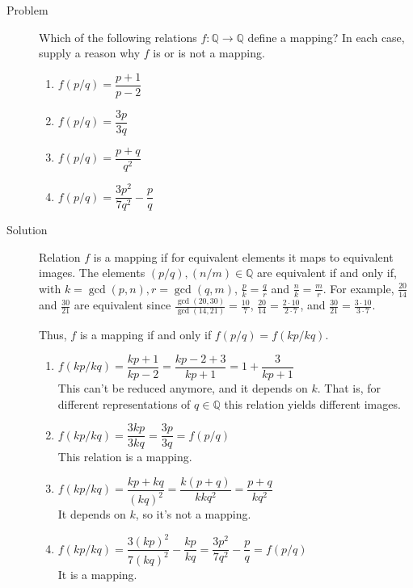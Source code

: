 \begin{description}
\item[Problem] Which of the following relations $f : \mathbb{Q} \rightarrow
\mathbb{Q}$ define a mapping? In each case, supply a reason why $f$ is or is
not a mapping.

\begin{multicols}{2}
\begin{enumerate}
\item $f(p / q) = \dfrac{p + 1}{p - 2}$
\item $f(p / q) = \dfrac{3p}{3q}$
\item $f(p / q) = \dfrac{p + q}{q^2}$
\item $f(p / q) = \dfrac{3p^2}{7q^2} - \dfrac{p}{q}$
\end{enumerate}
\end{multicols}

\item[Solution]

Relation $f$ is a mapping if for equivalent elements it maps to equivalent
images. The elements $(p / q), (n / m) \in \mathbb{Q}$ are equivalent if and
only if, with $k = \gcd(p, n), r = \gcd(q, m)$, $\frac{p}{k} = \frac{q}{r}$ and
$\frac{n}{k} = \frac{m}{r}$. For example, $\frac{20}{14}$ and $\frac{30}{21}$
are equivalent since $\frac{\gcd(20, 30)}{\gcd(14, 21)} = \frac{10}{7}$,
$\frac{20}{14} = \frac{2 \cdot 10}{2 \cdot 7}$, and $\frac{30}{21} = \frac{3
\cdot 10}{3 \cdot 7}$.

Thus, $f$ is a mapping if and only if $f(p / q) = f(kp / kq)$.

\begin{enumerate}
\item $f(kp / kq) = \dfrac{kp + 1}{kp - 2} = \dfrac{kp - 2 + 3}{kp + 1} =
  1 + \dfrac{3}{kp + 1}$\\
  This can't be reduced anymore, and it depends on $k$. That is, for different
  representations of $q \in \mathbb{Q}$ this relation yields different images.
\item $f(kp / kq) = \dfrac{3kp}{3kq} = \dfrac{3p}{3q} = f(p / q)$\\
  This relation is a mapping.
\item $f(kp / kq) = \dfrac{kp + kq}{(kq)^2} = \dfrac{k(p + q)}{kkq^2} =
  \dfrac{p + q}{kq^2}$\\
  It depends on $k$, so it's not a mapping.
\item $f(kp / kq) = \dfrac{3(kp)^2}{7(kq)^2} - \dfrac{kp}{kq} =
  \dfrac{3p^2}{7q^2} - \dfrac{p}{q} = f(p / q)$\\
  It is a mapping.
\end{enumerate}

\end{description}

